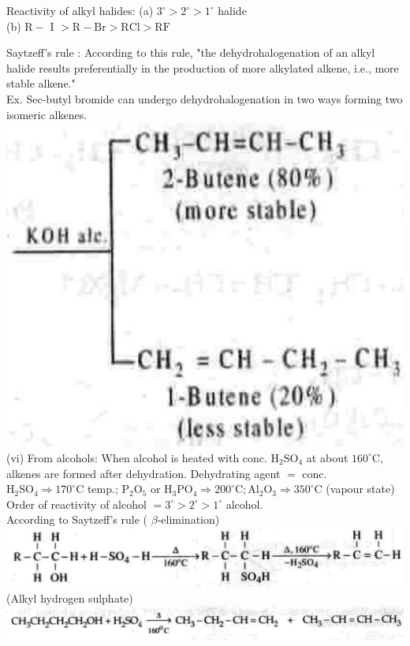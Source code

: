 \documentclass[10pt]{article}
\begin{document}
Reactivity of alkyl halides: (a) $3^{\circ}>2^{\circ}>1^{\circ}$ halide\\
(b) $\mathrm{R}-$ I $>\mathrm{R}-\mathrm{Br}>\mathrm{RCl}>\mathrm{RF}$

Saytzeff's rule : According to this rule, "the dehydrohalogenation of an alkyl halide results preferentially in the production of more alkylated alkene, i.e., more stable alkene."\\
Ex. Sec-butyl bromide can undergo dehydrohalogenation in two ways forming two isomeric alkenes.\\
\includegraphics[max width=\textwidth, center]{2025_01_28_8470952b98110cec3aabg-178(1)}\\
(vi) From alcohols: When alcohol is heated with conc. $\mathrm{H}_{2} \mathrm{SO}_{4}$ at about $160^{\circ} \mathrm{C}$, alkenes are formed after dehydration. Dehydrating agent $=$ conc. $\mathrm{H}_{2} \mathrm{SO}_{4} \Rightarrow 170^{\circ} \mathrm{C}$ temp.; $\mathrm{P}_{2} \mathrm{O}_{5}$ or $\mathrm{H}_{3} \mathrm{PO}_{4} \Rightarrow 200^{\circ} \mathrm{C} ; \mathrm{Al}_{2} \mathrm{O}_{3} \Rightarrow 350^{\circ} \mathrm{C}$ (vapour state)\\
Order of reactivity of alcohol $=3^{\circ}>2^{\circ}>1^{\circ}$ alcohol.\\
According to Saytzeff's rule ( $\beta$-elimination)\\
\includegraphics[max width=\textwidth, center]{2025_01_28_8470952b98110cec3aabg-178(2)}\\
(Alkyl hydrogen sulphate)\\
\includegraphics[max width=\textwidth, center]{2025_01_28_8470952b98110cec3aabg-178(5)}
\end{document}
